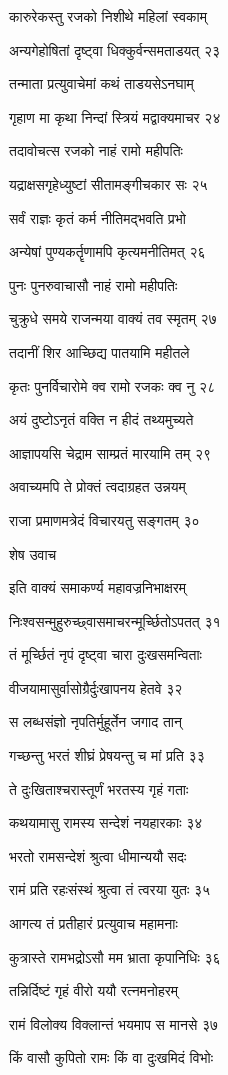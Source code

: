 कारुरेकस्तु रजको निशीथे महिलां स्वकाम्

अन्यगेहोषितां दृष्ट्वा धिक्कुर्वन्समताडयत् २३

तन्माता प्रत्युवाचेमां कथं ताडयसेऽनघाम्

गृहाण मा कृथा निन्दां स्त्रियं मद्वाक्यमाचर २४

तदावोचत्स रजको नाहं रामो महीपतिः

यद्राक्षसगृहेध्युष्टां सीतामङ्गीचकार सः २५

सर्वं राज्ञः कृतं कर्म नीतिमद्भवति प्रभो

अन्येषां पुण्यकर्तॄणामपि कृत्यमनीतिमत् २६

पुनः पुनरुवाचासौ नाहं रामो महीपतिः

चुक्रुधे समये राजन्मया वाक्यं तव स्मृतम् २७

तदानीं शिर आच्छिद्य पातयामि महीतले

कृतः पुनर्विचारोमे क्व रामो रजकः क्व नु २८

अयं दुष्टोऽनृतं वक्ति न हीदं तथ्यमुच्यते

आज्ञापयसि चेद्राम साम्प्रतं मारयामि तम् २९

अवाच्यमपि ते प्रोक्तं त्वदाग्रहत उन्नयम्

राजा प्रमाणमत्रेदं विचारयतु सङ्गतम् ३०

शेष उवाच

इति वाक्यं समाकर्ण्य महावज्रनिभाक्षरम्

निःश्वसन्मुहुरुच्छ्वासमाचरन्मूर्च्छितोऽपतत् ३१

तं मूर्च्छितं नृपं दृष्ट्वा चारा दुःखसमन्विताः

वीजयामासुर्वासोग्रैर्दुःखापनय हेतवे ३२

स लब्धसंज्ञो नृपतिर्मुहूर्तेन जगाद तान्

गच्छन्तु भरतं शीघ्रं प्रेषयन्तु च मां प्रति ३३

ते दुःखिताश्चरास्तूर्णं भरतस्य गृहं गताः

कथयामासु रामस्य सन्देशं नयहारकाः ३४

भरतो रामसन्देशं श्रुत्वा धीमान्ययौ सदः

रामं प्रति रहःसंस्थं श्रुत्वा तं त्वरया युतः ३५

आगत्य तं प्रतीहारं प्रत्युवाच महामनाः

कुत्रास्ते रामभद्रोऽसौ मम भ्राता कृपानिधिः ३६

तन्निर्दिष्टं गृहं वीरो ययौ रत्नमनोहरम्

रामं विलोक्य विक्लान्तं भयमाप स मानसे ३७

किं वासौ कुपितो रामः किं वा दुःखमिदं विभोः

